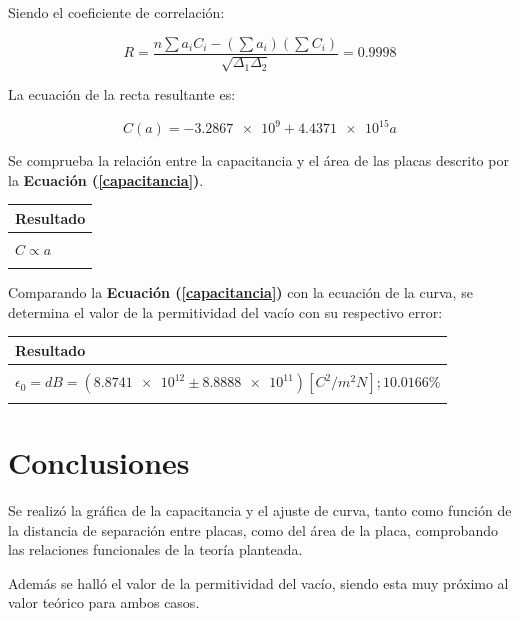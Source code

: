 \documentclass[letter,11pt]{article}
\begin{document}
Siendo el coeficiente de correlación:

\begin{equation*}
    R = \frac{n \sum a_i C_i - (\sum a_i)(\sum C_i)}{\sqrt{\Delta_1 \Delta_2}} = 0.9998
\end{equation*}

La ecuación de la recta resultante es:

\begin{equation*}
    C(a) = \num{-3.2867e9} + \num{4.4371e15} a
\end{equation*}

Se comprueba la relación entre la capacitancia y el área de las placas descrito
por la \textbf{Ecuación (\ref{capacitancia})}.

\begin{center}
\begin{tabular}{|>{\centering}m{9.2cm}<{\centering}|}
\hline
\textbf{Resultado} 
\tabularnewline \hline
\\
\Large{$C \propto a$} \tabularnewline
\\
\hline
\end{tabular}
\end{center}

Comparando la \textbf{Ecuación (\ref{capacitancia})} con la ecuación de la
curva, se determina el valor de la permitividad del vacío con su respectivo
error:

\begin{center}
\begin{tabular}{|>{\centering}m{12.0cm}<{\centering}|}
\hline
\textbf{Resultado}
\tabularnewline \hline
\\
    $\epsilon_0 = d B = (\num{8.8741e12} \pm \num{8.8888e11}) [C^2/m^2 N]; 10.0166\%$ \tabularnewline
\\
\hline
\end{tabular}
\end{center}

\section{Conclusiones}

Se realizó la gráfica de la capacitancia y el ajuste de curva, tanto como
función de la distancia de separación entre placas, como del área de la placa,
comprobando las relaciones funcionales de la teoría planteada.

Además se halló el valor de la permitividad del vacío, siendo esta muy próximo
al valor teórico para ambos casos.
\end{document}
